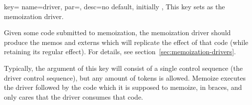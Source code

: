 \documentclass[a4paper,11pt]{article}
\begin{document}
\begin{doc}{
    key={
      name=driver, par=,
      desc={no default, initially }
    },
  }
  This key sets  as the memoization driver.

  Given some code submitted to memoization, the memoization driver should
  produce the memos and externs which will replicate the effect of that code
  (while retaining its regular effect).  For details, see
  section~\ref{sec:memoization-drivers}.

  Typically, the  argument of this key will consist of a single
  control sequence (the driver control sequence), but any amount of tokens is
  allowed.  Memoize executes the driver followed by the code which it is
  supposed to memoize, in braces, and only cares that the driver consumes that
  code.
\end{doc}
\end{document}
